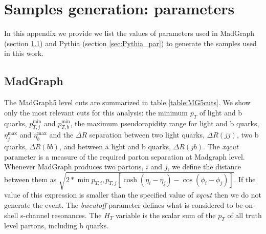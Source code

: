 
\chapter{Samples generation: parameters}
\label{chapter:samples_gen}

In this appendix we provide we list the values of parameters used in MadGraph (section \ref{sec:MG_par}) and Pythia (section \ref{sec:Pythia_par}) to generate the samples used in this work. 

\section{MadGraph}
\label{sec:MG_par}

The MadGraph5 level cuts are summarized in table \ref{table:MG5cuts}. We show only the most relevant cuts for this analysis: the minimum $p_T$ of light and b quarks, $p_{T,j}^{\min}$ and $p_{T,b}^{\min}$, the maximum pseudorapidity range for light and b quarks, $\eta_j^{\max}$ and $\eta_b^{\max}$ and the $\Delta R$ separation between two light quarks, $\Delta R(jj)$, two b quarks, $\Delta R(bb)$, and between a light and b quarks, $\Delta R(jb)$. The \textit{xqcut} parameter is a measure of the required parton separation at Madgraph level. Whenever MadGraph produces two partons, $i$ and $j$, we define the distance between them as $\sqrt{2*\min{p_{T,i},p_{T,j}}[\cosh{(\eta_i-\eta_j)}-\cos{(\phi_i-\phi_j)}]}$. If the value of this expression is smaller than the specified value of \textit{xqcut} then we do not generate the event. The \textit{bwcutoff} parameter defines what is considered to be on-shell s-channel resonances. The $H_T$ variable is the scalar sum of the $p_T$ of all truth level partons, including b quarks.

